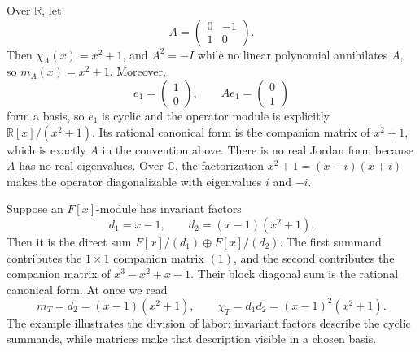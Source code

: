 \begin{example}
Over \(\mathbb R\), let
\[
A=\begin{pmatrix}0&-1\\1&0\end{pmatrix}.
\]
Then \(\chi_A(x)=x^2+1\), and \(A^2=-I\) while no linear polynomial
annihilates \(A\), so \(m_A(x)=x^2+1\). Moreover,
\[
e_1=\begin{pmatrix}1\\0\end{pmatrix},
\qquad Ae_1=\begin{pmatrix}0\\1\end{pmatrix}
\]
form a basis, so \(e_1\) is cyclic and the operator module is explicitly
\(\mathbb R[x]/(x^2+1)\). Its rational canonical form is the companion
matrix of \(x^2+1\), which is exactly \(A\) in the convention above. There
is no real Jordan form because \(A\) has no real eigenvalues. Over
\(\mathbb C\), the factorization \(x^2+1=(x-i)(x+i)\) makes the operator
diagonalizable with eigenvalues \(i\) and \(-i\).
\end{example}

\begin{example}
Suppose an \(F[x]\)-module has invariant factors
\[d_1=x-1,\qquad d_2=(x-1)(x^2+1).\]
Then it is the direct sum \(F[x]/(d_1)\oplus F[x]/(d_2)\). The first
summand contributes the \(1\times1\) companion matrix \((1)\), and the
second contributes the companion matrix of
\(x^3-x^2+x-1\). Their block diagonal sum is the rational canonical form.
At once we read
\[m_T=d_2=(x-1)(x^2+1),\qquad
\chi_T=d_1d_2=(x-1)^2(x^2+1).\]
The example illustrates the division of labor: invariant factors describe
the cyclic summands, while matrices make that description visible in a chosen
basis.
\end{example}

